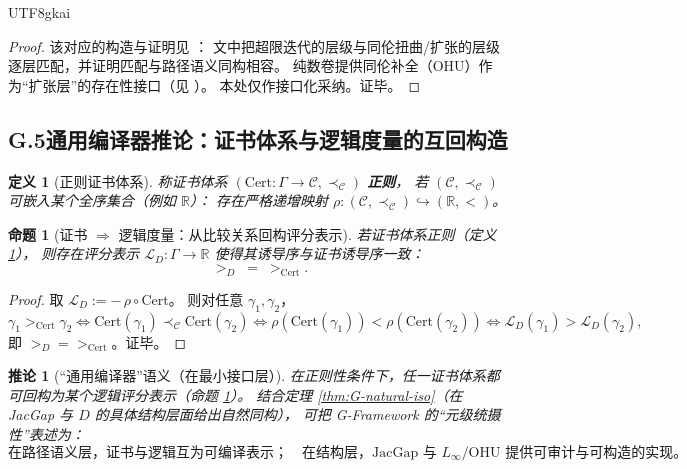 \documentclass[12pt]{article}
\newtheorem{definition}{定义}[section]
\newtheorem{proposition}{命题}[section]
\newtheorem{corollary}{推论}[section]
\begin{document}
\begin{CJK*}{UTF8}{gkai}
\begin{proof}
该对应的构造与证明见 \cite{GZJacGapDStructEquiv}：
文中把超限迭代的层级与同伦扭曲/扩张的层级逐层匹配，并证明匹配与路径语义同构相容。
纯数卷提供同伦补全（OHU）作为“扩张层”的存在性接口（见 \cite{GaoZheng2025GFramework}）。
本处仅作接口化采纳。证毕。
\end{proof}

\subsection{G.5\;通用编译器推论：证书体系与逻辑度量的互回构造}

\begin{definition}[正则证书体系]\label{def:G-regular-certificate}
称证书体系 $(\mathrm{Cert}:\Gamma\to\mathcal{C},\prec_{\mathcal{C}})$ \textbf{正则}，
若 $(\mathcal{C},\prec_{\mathcal{C}})$ 可嵌入某个全序集合（例如 $\mathbb{R}$）：
存在严格递增映射 $\rho:(\mathcal{C},\prec_{\mathcal{C}})\hookrightarrow(\mathbb{R},<)$。
\end{definition}

\begin{proposition}[证书 $\Rightarrow$ 逻辑度量：从比较关系回构评分表示]\label{prop:G-cert-to-score}
若证书体系正则（定义 \ref{def:G-regular-certificate}），
则存在评分表示 $\mathcal{L}_D:\Gamma\to\mathbb{R}$ 使得其诱导序与证书诱导序一致：
\[
  >_D \;=\; >_{\mathrm{Cert}}.
\]
\end{proposition}

\begin{proof}
取 $\mathcal{L}_D:= -\,\rho\circ \mathrm{Cert}$。
则对任意 $\gamma_1,\gamma_2$，
\[
  \gamma_1 >_{\mathrm{Cert}} \gamma_2
  \Longleftrightarrow
  \mathrm{Cert}(\gamma_1)\prec_{\mathcal{C}}\mathrm{Cert}(\gamma_2)
  \Longleftrightarrow
  \rho(\mathrm{Cert}(\gamma_1))<\rho(\mathrm{Cert}(\gamma_2))
  \Longleftrightarrow
  \mathcal{L}_D(\gamma_1)>\mathcal{L}_D(\gamma_2),
\]
即 $>_D=>_{\mathrm{Cert}}$。证毕。
\end{proof}

\begin{corollary}[“通用编译器”语义（在最小接口层）]\label{cor:G-universal-compiler}
在正则性条件下，任一证书体系都可回构为某个逻辑评分表示（命题 \ref{prop:G-cert-to-score}）。
结合定理 \ref{thm:G-natural-iso}（在 JacGap 与 $D$ 的具体结构层面给出自然同构），
可把 G-Framework 的“元级统摄性”表述为：
\[
  \text{在路径语义层，证书与逻辑互为可编译表示；}
  \quad
  \text{在结构层，JacGap 与 $L_\infty$/OHU 提供可审计与可构造的实现。}
\]
\end{corollary}


\end{CJK*}
\end{document}

